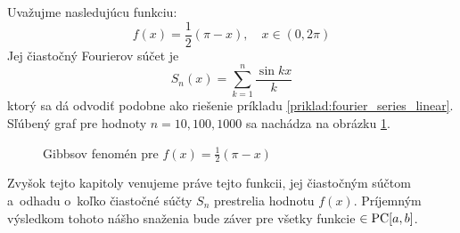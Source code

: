 \begin{priklad}
    Uvažujme nasledujúcu funkciu:
    \begin{equation*}
        f(x) = \frac{1}{2} (\pi-x), \quad x\in(0,2\pi)
    \end{equation*}
    Jej čiastočný Fourierov súčet je
    \begin{equation*}
        S_n(x) = \sum_{k=1}^{n} \frac{\sin kx}{k}
    \end{equation*}
    ktorý sa dá odvodiť podobne ako riešenie príkladu
    \ref{priklad:fourier_series_linear}.
    Sľúbený graf pre hodnoty $n=10,100,1000$ sa nachádza na obrázku
    \ref{fig:gibbs_lin}.
    \begin{figure}[htp]
        \centering
        \caption{Gibbsov fenomén pre $f(x) = \frac{1}{2}(\pi-x)$}
        \label{fig:gibbs_lin}
    \end{figure}    
    \label{priklad:gibbs_linear}
\end{priklad}

Zvyšok tejto kapitoly venujeme práve tejto funkcii, jej čiastočným
súčtom a~odhadu o~koľko čiastočné súčty $S_n$ prestrelia hodnotu
$f(x)$. Príjemným výsledkom tohoto nášho snaženia bude záver pre
všetky funkcie $\in \mbox{PC}[a,b]$.


